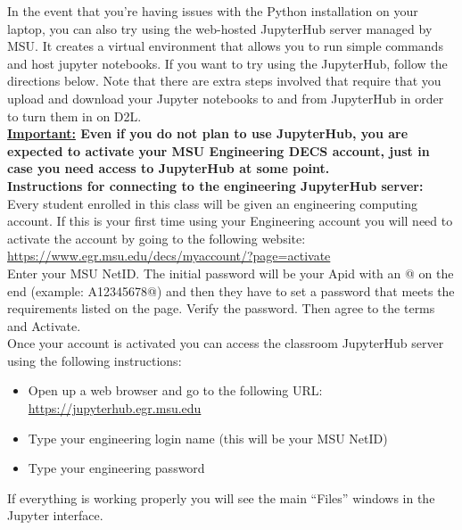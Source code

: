 \documentclass[oneside,letterpaper,11pt]{exam}
\begin{document}
{\noindent In the event that you're having issues with the Python installation on your laptop, you can also try using the web-hosted JupyterHub server managed by MSU. It creates a virtual environment that allows you to run simple commands and host jupyter notebooks. If you want to try using the JupyterHub, follow the directions below. Note that there are extra steps involved that require that you upload and download your Jupyter notebooks to and from JupyterHub in order to turn them in on D2L.}\\[-5pt]

{\noindent \textbf{\underline{Important:} Even if you do not plan to use JupyterHub, you are expected to activate your MSU Engineering DECS account, just in case you need access to JupyterHub at some point.}}\\



{\noindent \textbf{Instructions for connecting to the engineering JupyterHub server:}}\\[-5pt]

{\noindent Every student enrolled in this class will be given an engineering computing account. If this is your first time using your Engineering account you will need to activate the account by going to the following website: \url{https://www.egr.msu.edu/decs/myaccount/?page=activate}}\\[-5pt]

{\noindent Enter your MSU NetID. The initial password will be your Apid with an @ on the end (example: A12345678@) and then they have to set a password that meets the requirements listed on the page. Verify the password. Then agree to the terms and Activate.}\\[-5pt]

{\noindent Once your account is activated you can access the classroom JupyterHub server using the following instructions:}
\begin{itemize}
\item[1.] Open up a web browser and go to the following URL: \url{https://jupyterhub.egr.msu.edu} \\[-15pt]
\item[2.] Type your engineering login name (this will be your MSU NetID) \\[-15pt]
\item[3.] Type your engineering password
\end{itemize}
{\noindent If everything is working properly you will see the main ``Files'' windows in the Jupyter interface.}\\
\end{document}
